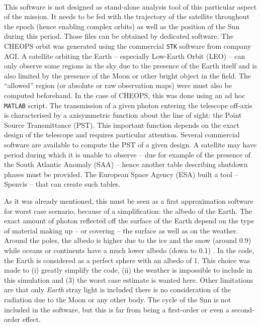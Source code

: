 \documentclass[a4paper,10pt]{article}
\begin{document}
\paragraph{}
This software is not designed as stand-alone analysis tool of this particular aspect of the mission. It needs to be fed with the trajectory of the satellite throughout the epoch (hence enabling complex orbits) as well as the position of the Sun during this period. Those files can be obtained by dedicated software. 
The CHEOPS orbit was generated using the commercial \verb=STK= software from company AGI. A satellite orbiting the Earth -- especially Low-Earth Orbit (LEO) -- can only observe some regions in the sky due to the presence of the Earth itself and is also limited by the presence of the Moon or other bright object in the field. The ``allowed'' region (or absolute or raw observation maps) were must also be computed beforehand. 
In the case of CHEOPS, this was done using an ad hoc \verb=MATLAB= script. The transmission of a given photon entering the telescope off-axis is characterised by a axisymmetric function about the line of sight: the Point Source Transmittance (PST). This important function depends on the exact design of the telescope and requires particular attention. Several commercial software are available to compute the PST of a given design. 
A satellite may have period during which it is unable to observe -- due for example of the presence of the South Atlantic Anomaly (SAA) -- hence another table describing shutdown phases must be provided. The European Space Agency (ESA) built a tool -- Spenvis -- that can create such tables.

As it was already mentioned, this must be seen as a first approximation software for worst case scenario, because of a simplification: the albedo of the Earth. The exact amount of photon reflected off the surface of the Earth depend on the type of material making up -- or covering -- the surface as well as on the weather. Around the poles, the albedo is higher due to the ice and the snow (around 0.9) while oceans or continents have a much lower albedo (down to 0.1) \citep{Pater2001}. In the code, the Earth is considered as a perfect sphere with an albedo of 1. This choice was made to (i) greatly simplify the code, (ii) the weather is impossible to include in this simulation and (3) the worst case estimate is wanted here. Other limitations are that only \emph{Earth} stray light is included there is no consideration of the radiation due to the Moon or any other body. The cycle of the Sun is not included in the software, but this is far from being a first-order or even a second-order 
effect.
\end{document}
